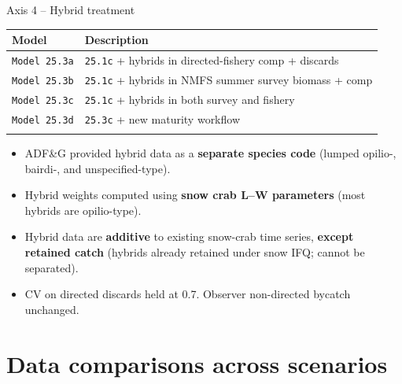 \documentclass[
  10pt,
  ignorenonframetext,
  aspectratio=169,
]{beamer}
\providecommand{\tightlist}{%
  \setlength{\itemsep}{0pt}\setlength{\parskip}{0pt}}
\begin{document}
\begin{frame}[fragile]{Axis 4 -- Hybrid treatment}
\label{axis-4-hybrid-treatment}
\small

\begin{longtable}[]{@{}
  >{\raggedright\arraybackslash}p{}
  >{\raggedright\arraybackslash}p{}@{}}
\toprule\noalign{}
\begin{minipage}[b]{\linewidth}\raggedright
Model
\end{minipage} & \begin{minipage}[b]{\linewidth}\raggedright
Description
\end{minipage} \\
\midrule\noalign{}
\endhead
\texttt{Model\ 25.3a} & \texttt{25.1c} + hybrids in directed-fishery
comp + discards \\
\texttt{Model\ 25.3b} & \texttt{25.1c} + hybrids in NMFS summer survey
biomass + comp \\
\texttt{Model\ 25.3c} & \texttt{25.1c} + hybrids in both survey and
fishery \\
\texttt{Model\ 25.3d} & \texttt{25.3c} + new maturity workflow \\
\bottomrule\noalign{}
\end{longtable}

\medskip

\begin{itemize}
\tightlist
\item
  ADF\&G provided hybrid data as a \textbf{separate species code}
  (lumped opilio-, bairdi-, and unspecified-type).
\item
  Hybrid weights computed using \textbf{snow crab L--W parameters} (most
  hybrids are opilio-type).
\item
  Hybrid data are \textbf{additive} to existing snow-crab time series,
  \textbf{except retained catch} (hybrids already retained under snow
  IFQ; cannot be separated).
\item
  CV on directed discards held at 0.7. Observer non-directed bycatch
  unchanged.
\end{itemize}
\end{frame}

\section{Data comparisons across
scenarios}\label{data-comparisons-across-scenarios}
\end{document}
